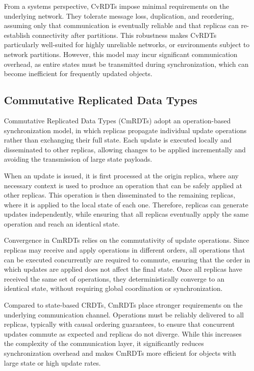 From a systems perspective, CvRDTs impose minimal requirements on the underlying network. They tolerate message loss, duplication, and reordering, assuming only that communication is eventually reliable and that replicas can re-establish connectivity after partitions. This robustness makes CvRDTs particularly well-suited for highly unreliable networks, or environments subject to network partitions. However, this model may incur significant communication overhead, as entire states must be transmitted during synchronization, which can become inefficient for frequently updated objects.

\subsection{Commutative Replicated Data Types}
\label{sub:cmrdts}

Commutative Replicated Data Types (CmRDTs) adopt an operation-based synchronization model, in which replicas propagate individual update operations rather than exchanging their full state. Each update is executed locally and disseminated to other replicas, allowing changes to be applied incrementally and avoiding the transmission of large state payloads.

When an update is issued, it is first processed at the origin replica, where any necessary context is used to produce an operation that can be safely applied at other replicas. This operation is then disseminated to the remaining replicas, where it is applied to the local state of each one. Therefore, replicas can generate updates independently, while ensuring that all replicas eventually apply the same operation and reach an identical state.

Convergence in CmRDTs relies on the commutativity of update operations. Since replicas may receive and apply operations in different orders, all operations that can be executed concurrently are required to commute, ensuring that the order in which updates are applied does not affect the final state. Once all replicas have received the same set of operations, they deterministically converge to an identical state, without requiring global coordination or synchronization.

Compared to state-based CRDTs, CmRDTs place stronger requirements on the underlying communication channel. Operations must be reliably delivered to all replicas, typically with causal ordering guarantees, to ensure that concurrent updates commute as expected and replicas do not diverge. While this increases the complexity of the communication layer, it significantly reduces synchronization overhead and makes CmRDTs more efficient for objects with large state or high update rates.

